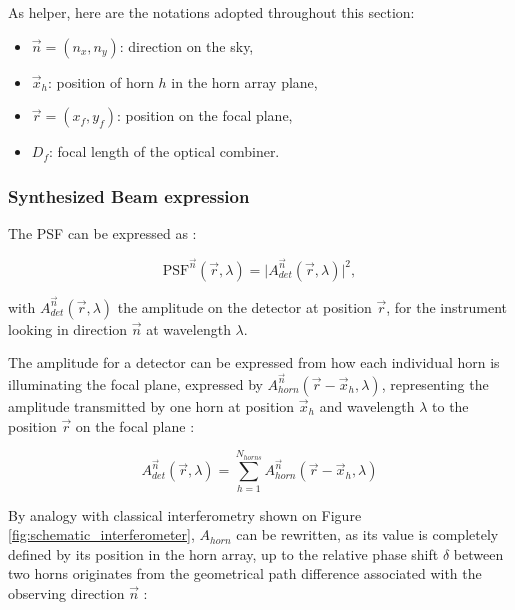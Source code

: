 \documentclass[../../thesis.tex]{subfiles}
\begin{document}
As helper, here are the notations adopted throughout this section:
\begin{itemize}
    \item $\vec{n} = (n_x,n_y)$: direction on the sky,
    \item $\vec{x}_h$: position of horn $h$ in the horn array plane,
    \item $\vec{r} = (x_f,y_f)$: position on the focal plane,
    \item $D_f$: focal length of the optical combiner.
\end{itemize}

\subsubsection{Synthesized Beam expression}


The PSF can be expressed as : 

\begin{equation} \label{eq:psf}
    \mathrm{PSF}^{\vec{n}}(\vec{r}, \lambda) = \vert A_{det}^{\vec{n}}(\vec{r}, \lambda)\vert ^2,
\end{equation}

with $A_{det}^{\vec{n}}(\vec{r}, \lambda)$ the amplitude on the detector at position $\vec{r}$, for the instrument looking in direction $\vec{n}$ at wavelength $\lambda$.

The amplitude for a detector can be expressed from how each individual horn is illuminating the focal plane, expressed by $A_{horn}^{\vec{n}}(\vec{r} - \vec{x}_h, \lambda)$, representing the amplitude transmitted by one horn at position  $\vec{x}_h$ and wavelength $\lambda$ to the position $\vec{r}$ on the focal plane : 

\begin{equation} \label{eq:A_det_A_horn}
    A_{det}^{\vec{n}}(\vec{r}, \lambda) = \sum_{h = 1}^{N_{horns}} A_{horn}^{\vec{n}}(\vec{r} - \vec{x}_h, \lambda)
\end{equation}

By analogy with classical interferometry shown on Figure \ref{fig:schematic_interferometer}, $A_{horn}$ can be rewritten, as its value is completely defined by its position in the horn array, up to the relative phase shift $\delta$ between two horns originates from the geometrical path difference associated with the observing direction $\vec n$ : 
\end{document}
